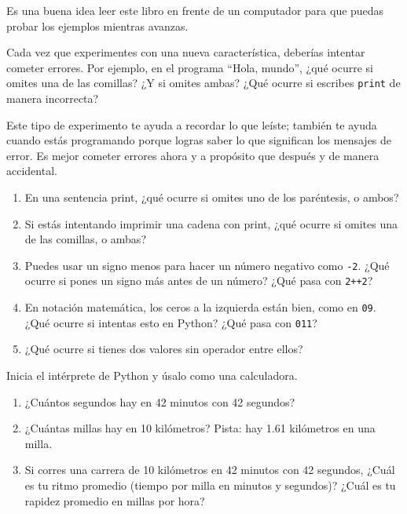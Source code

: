 \documentclass[10pt]{book}
\begin{document}
\begin{exercise}

Es una buena idea leer este libro en frente de un computador para que puedas
probar los ejemplos mientras avanzas.

Cada vez que experimentes con una nueva característica, deberías intentar
cometer errores.  Por ejemplo, en el programa ``Hola, mundo'',
¿qué ocurre si omites una de las comillas?  ¿Y
si omites ambas?  ¿Qué ocurre si escribes {\tt print} de manera incorrecta?

Este tipo de experimento te ayuda a recordar lo que leíste; también
te ayuda cuando estás programando porque logras saber lo que significan los
mensajes de error.  Es mejor cometer errores ahora y a propósito que
después y de manera accidental.

\begin{enumerate}

\item En una sentencia print, ¿qué ocurre si omites uno
de los paréntesis, o ambos?

\item Si estás intentando imprimir una cadena con print, ¿qué ocurre si
omites una de las comillas, o ambas?

\item Puedes usar un signo menos para hacer un número negativo como
{\tt -2}.  ¿Qué ocurre si pones un signo más antes de un número?
¿Qué pasa con {\tt 2++2}?

\item En notación matemática, los ceros a la izquierda están bien, como en {\tt 09}.
¿Qué ocurre si intentas esto en Python?  ¿Qué pasa con {\tt 011}?

\item ¿Qué ocurre si tienes dos valores sin operador
entre ellos?

\end{enumerate}

\end{exercise}



\begin{exercise}

Inicia el intérprete de Python y úsalo como una calculadora.

\begin{enumerate}

\item ¿Cuántos segundos hay en 42 minutos con 42 segundos?

\item ¿Cuántas millas hay en 10 kilómetros?  Pista: hay 1.61
  kilómetros en una milla.

\item Si corres una carrera de 10 kilómetros en 42 minutos con 42 segundos,
  ¿Cuál es tu ritmo promedio (tiempo por milla en minutos y segundos)?  ¿Cuál
  es tu rapidez promedio en millas por hora?


\end{enumerate}

\end{exercise}
\end{document}
